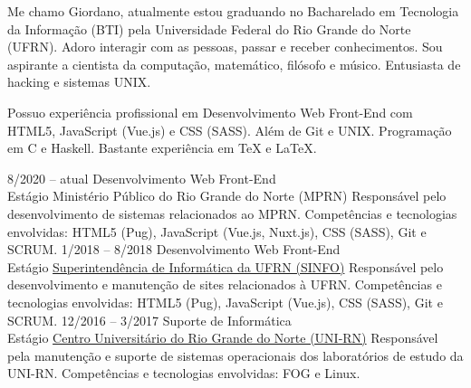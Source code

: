 \documentclass[9pt]{developercv}
\begin{document}
	\maketitle

	\begin{minipage}[t]{1\textwidth}
		Me chamo Giordano, atualmente estou gradu\-ando no Bacharelado em Tecnologia da Informação (BTI) pela Universidade Federal do Rio Grande do Norte (UFRN).
		Adoro interagir com as pessoas, passar e receber conhecimentos. Sou aspirante a cientista da computação, matemático, filósofo e músico. Entusiasta de hacking e sistemas UNIX. 
	\end{minipage}
	
	\begin{minipage}[t]{1\textwidth}
		Possuo experiência profissional em Desenvolvimento Web Front-End com HTML5, JavaScript (Vue.js) e CSS (SASS). Além de Git e UNIX. Programação em C e Haskell. Bastante experiência em \TeX{} e \LaTeX{}.
	\end{minipage}


	\begin{entrylist}
		\entry
			{8/2020 -- atual}
			{Desenvolvimento Web Front-End\\
				\footnotesize{Estágio}}
            {Ministério Público do Rio Grande do Norte (MPRN)}
			{Responsável pelo desenvolvimento de sistemas relacionados ao MPRN.
				Competências e tecnologias envolvidas: HTML5 (Pug), JavaScript (Vue.js, Nuxt.js), CSS (SASS), Git e SCRUM.}
		\entry
			{1/2018 -- 8/2018}
			{Desenvolvimento Web Front-End\\
				\footnotesize{Estágio}}
			{\href{https://www.info.ufrn.br/}{Superintendência de Informática da UFRN (SINFO)}}
			{Responsável pelo desenvolvimento e manutenção de sites relacionados à UFRN.
				Competências e tecnologias envolvidas: HTML5 (Pug), JavaScript (Vue.js), CSS (SASS), Git e SCRUM.}
		\entry
			{12/2016 -- 3/2017}
			{Suporte de Informática\\
				\footnotesize{Estágio}}
			{\href{http://unirn.edu.br/}{Centro Universitário do Rio Grande do Norte (UNI-RN)}}
			{Responsável pela manutenção e suporte de sistemas operacionais dos laboratórios de estudo da UNI-RN.
				Competências e tecnologias envolvidas: FOG e Linux.}
	\end{entrylist}
\end{document}
